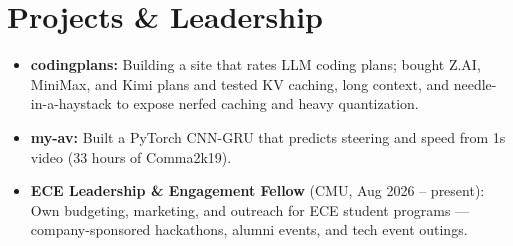 \documentclass[11pt, letterpaper]{article}
\begin{document}
\section{Projects \& Leadership}
\begin{itemize}
  \item \textbf{codingplans:} Building a site that rates LLM coding plans; bought Z.AI, MiniMax, and Kimi plans and tested KV caching, long context, and needle-in-a-haystack to expose nerfed caching and heavy quantization.
  \item \textbf{my-av:} Built a PyTorch CNN-GRU that predicts steering and speed from 1s video (33 hours of Comma2k19).
  \item \textbf{ECE Leadership \& Engagement Fellow} (CMU, Aug 2026 -- present): Own budgeting, marketing, and outreach for ECE student programs --- company-sponsored hackathons, alumni events, and tech event outings.
\end{itemize}
\end{document}
